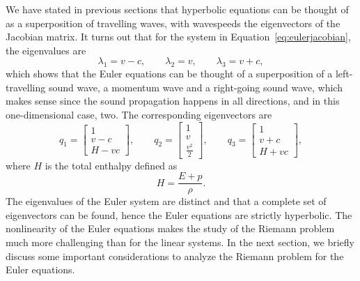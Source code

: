 We have stated in previous sections that hyperbolic equations can be thought of as a superposition of travelling waves, with wavespeeds the eigenvectors of the Jacobian matrix. It turns out that for the system in Equation~\ref{eq:eulerjacobian}, the eigenvalues are 
\begin{equation}
	\lambda_1 = v - c, \quad\quad \lambda_2 = v, \quad\quad \lambda_3 = v + c,
\end{equation}
which shows that the Euler equations can be thought of a superposition of a left-travelling sound wave, a momentum wave and a right-going sound wave, which makes sense since the sound propagation happens in all directions, and in this one-dimensional case, two. The corresponding eigenvectors are 
\begin{equation}
	q_1 = \begin{bmatrix}
		1 \\ v - c \\ H - vc
	\end{bmatrix},
	\quad\quad
	q_2 = \begin{bmatrix}
		1 \\ v \\ \frac{v^2}{2}
	\end{bmatrix},
	\quad\quad
	q_3 = \begin{bmatrix}
		1 \\ v + c \\ H + vc
	\end{bmatrix},
\end{equation}
where $H$ is the total enthalpy defined as
\begin{equation}
	H = \frac{E + p}{\rho}.
\end{equation} 
The eigenvalues of the Euler system are distinct and that a complete set of eigenvectors can be found, hence the Euler equations are strictly hyperbolic.  The nonlinearity of the Euler equations makes the study of the Riemann problem much more challenging than for the linear systems. In the next section, we briefly discuss some important considerations to analyze the Riemann problem for the Euler equations.

